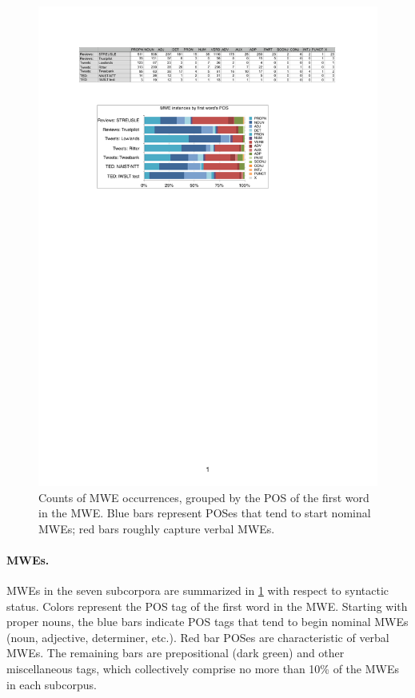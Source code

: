\documentclass[11pt,letterpaper]{article}
\begin{document}
\begin{figure}
\includegraphics[width=\columnwidth]{figs/mwes-pos.pdf}
\caption{Counts of MWE occurrences, grouped by the POS of the first word in the MWE. 
Blue bars represent POSes that tend to start nominal MWEs; red bars roughly capture verbal MWEs.}
\label{fig:mwes-pos}
\end{figure}

\paragraph{MWEs.} MWEs in the seven subcorpora are summarized in \cref{fig:mwes-pos} with respect to syntactic status. 
Colors represent the POS tag of the first word in the MWE. 
Starting with proper nouns, the blue bars indicate POS tags that tend to begin nominal MWEs (noun, adjective, determiner, etc.).
Red bar POSes are characteristic of verbal MWEs. The remaining bars are prepositional (dark green) 
and other miscellaneous tags, which collectively comprise no more than 10\% of the MWEs in each subcorpus.
\end{document}
